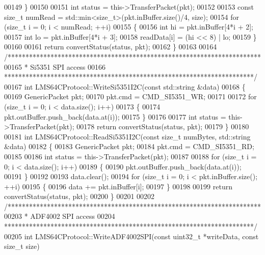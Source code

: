 \begin{DoxyCode}
00149     \}
00150 
00151     \textcolor{keywordtype}{int} status = this->TransferPacket(pkt);
00152 
00153     \textcolor{keyword}{const} \textcolor{keywordtype}{size\_t} numRead = std::min<size\_t>(pkt.inBuffer.size()/4, size);
00154     \textcolor{keywordflow}{for} (\textcolor{keywordtype}{size\_t} i = 0; i < numRead; ++i)
00155     \{
00156         \textcolor{keywordtype}{int} hi = pkt.inBuffer[4*i + 2];
00157         \textcolor{keywordtype}{int} lo = pkt.inBuffer[4*i + 3];
00158         readData[i] = (hi << 8) | lo;
00159     \}
00160 
00161     \textcolor{keywordflow}{return} convertStatus(status, pkt);
00162 \}
00163 
00164 \textcolor{comment}{/***********************************************************************}
00165 \textcolor{comment}{ * Si5351 SPI access}
00166 \textcolor{comment}{ **********************************************************************/}
00167 \textcolor{keywordtype}{int} LMS64CProtocol::WriteSi5351I2C(\textcolor{keyword}{const} std::string &data)
00168 \{
00169     GenericPacket pkt;
00170     pkt.cmd = CMD_SI5351_WR;
00171 
00172     \textcolor{keywordflow}{for} (\textcolor{keywordtype}{size\_t} i = 0; i < data.size(); i++)
00173     \{
00174         pkt.outBuffer.push\_back(data.at(i));
00175     \}
00176 
00177     \textcolor{keywordtype}{int} status = this->TransferPacket(pkt);
00178     \textcolor{keywordflow}{return} convertStatus(status, pkt);
00179 \}
00180 
00181 \textcolor{keywordtype}{int} LMS64CProtocol::ReadSi5351I2C(\textcolor{keyword}{const} \textcolor{keywordtype}{size\_t} numBytes, std::string &data)
00182 \{
00183     GenericPacket pkt;
00184     pkt.cmd = CMD_SI5351_RD;
00185 
00186     \textcolor{keywordtype}{int} status = this->TransferPacket(pkt);
00187 
00188     \textcolor{keywordflow}{for} (\textcolor{keywordtype}{size\_t} i = 0; i < data.size(); i++)
00189     \{
00190         pkt.outBuffer.push\_back(data.at(i));
00191     \}
00192 
00193     data.clear();
00194     \textcolor{keywordflow}{for} (\textcolor{keywordtype}{size\_t} i = 0; i < pkt.inBuffer.size(); ++i)
00195     \{
00196         data += pkt.inBuffer[i];
00197     \}
00198 
00199     \textcolor{keywordflow}{return} convertStatus(status, pkt);
00200 \}
00201 
00202 \textcolor{comment}{/***********************************************************************}
00203 \textcolor{comment}{ * ADF4002 SPI access}
00204 \textcolor{comment}{ **********************************************************************/}
00205 \textcolor{keywordtype}{int} LMS64CProtocol::WriteADF4002SPI(\textcolor{keyword}{const} uint32\_t *writeData, \textcolor{keyword}{const} \textcolor{keywordtype}{size\_t} size)

\end{DoxyCode}
